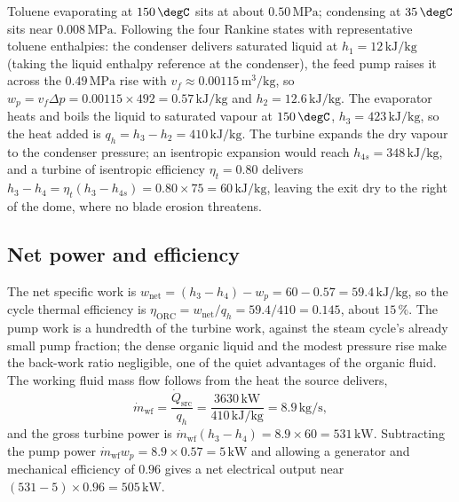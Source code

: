 Toluene evaporating at $150\,\degC$ sits at about $0.50\,\text{MPa}$; condensing
at $35\,\degC$ sits near $0.008\,\text{MPa}$. Following the four Rankine states
with representative toluene enthalpies: the condenser delivers saturated liquid
at $h_1 = 12\,\text{kJ}/\text{kg}$ (taking the liquid enthalpy reference at the
condenser), the feed pump raises it across the $0.49\,\text{MPa}$ rise with
$v_f \approx 0.00115\,\text{m}^3/\text{kg}$, so $w_p = v_f \Delta p = 0.00115
\times 492 = 0.57\,\text{kJ}/\text{kg}$ and $h_2 = 12.6\,\text{kJ}/\text{kg}$.
The evaporator heats and boils the liquid to saturated vapour at $150\,\degC$,
$h_3 = 423\,\text{kJ}/\text{kg}$, so the heat added is $q_h = h_3 - h_2 =
410\,\text{kJ}/\text{kg}$. The turbine expands the dry vapour to the condenser
pressure; an isentropic expansion would reach $h_{4s} = 348\,\text{kJ}/\text{kg}$,
and a turbine of isentropic efficiency $\eta_t = 0.80$ delivers $h_3 - h_4 =
\eta_t(h_3 - h_{4s}) = 0.80 \times 75 = 60\,\text{kJ}/\text{kg}$, leaving the
exit dry to the right of the dome, where no blade erosion threatens.

\subsection{Net power and efficiency}

The net specific work is $w_{\text{net}} = (h_3 - h_4) - w_p = 60 - 0.57 =
59.4\,\text{kJ}/\text{kg}$, so the cycle thermal efficiency is $\eta_{\text{ORC}}
= w_{\text{net}}/q_h = 59.4/410 = 0.145$, about $15\,\%$. The pump work is a
hundredth of the turbine work, against the steam cycle's already small pump
fraction; the dense organic liquid and the modest pressure rise make the back-work
ratio negligible, one of the quiet advantages of the organic fluid. The working
fluid mass flow follows from the heat the source delivers,
\[
\dot m_{\text{wf}} = \frac{\dot Q_{\text{src}}}{q_h} =
\frac{3630\,\si{\kilo\watt}}{410\,\text{kJ}/\text{kg}} = 8.9\,\text{kg}/\text{s},
\]
and the gross turbine power is $\dot m_{\text{wf}}(h_3 - h_4) = 8.9 \times 60 =
531\,\text{kW}$. Subtracting the pump power $\dot m_{\text{wf}} w_p = 8.9 \times
0.57 = 5\,\text{kW}$ and allowing a generator and mechanical efficiency of
$0.96$ gives a net electrical output near $(531 - 5) \times 0.96 = 505\,\text{kW}$.

